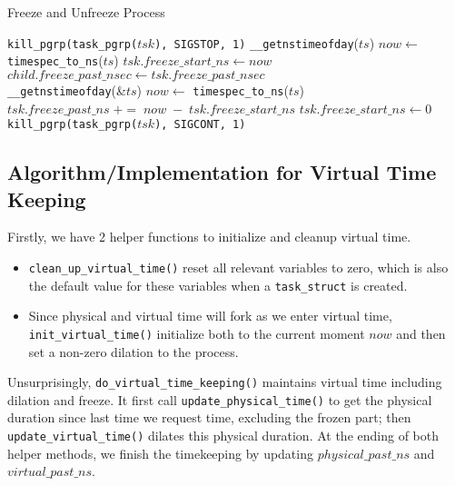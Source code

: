 \documentclass{acm_proc_article-sp}
\begin{document}
\label{Sub-Sec-Alg-Impl-Freeze}
\begin{algorithm*}[t]
\caption{Freeze and Unfreeze Process}
\label{Alg-Freeze}
\begin{algorithmic}[1]
\State \texttt{kill\_pgrp(task\_pgrp($tsk$), SIGSTOP, 1)}
\State \texttt{\_\_getnstimeofday}($ts$)
\State $now \gets$ \texttt{timespec\_to\_ns}($ts$)
\State $tsk.freeze\_start\_ns \gets now$
\EndFunction
\\
	\State $child.freeze\_past\_nsec \gets tsk.freeze\_past\_nsec$
	\State {}
\EndFor
\EndFunction
\\
\State \texttt{\_\_getnstimeofday}(\&$ts$)
\State $now \gets$ \texttt{timespec\_to\_ns}($ts$)
\State $tsk.freeze\_past\_ns \; += \; now \; - \; tsk.freeze\_start\_ns$
\State $tsk.freeze\_start\_ns \gets 0$
\State {}
\State \texttt{kill\_pgrp(task\_pgrp($tsk$), SIGCONT, 1)}
\EndFunction
\end{algorithmic}
\end{algorithm*}

\subsection{Algorithm/Implementation for Virtual Time Keeping}
Firstly, we have 2 helper functions to initialize and cleanup virtual time. 
\begin{itemize}
\item \texttt{clean\_up\_virtual\_time()} reset all relevant variables to zero, which is also the default value for these variables when a \texttt{task\_struct} is created.
\item Since physical and virtual time will fork as we enter virtual time, \texttt{init\_virtual\_time()} initialize both to the current moment $now$ and then set a non-zero dilation to the process. 
\end{itemize}

Unsurprisingly, \texttt{do\_virtual\_time\_keeping()} maintains virtual time including dilation and freeze. 
It first call \texttt{update\_physical\_time()} to get the physical duration since last time we request time, excluding the frozen part; then 
\texttt{update\_virtual\_time()} dilates this physical duration.
At the ending of both helper methods, we finish the timekeeping by updating $physical\_past\_ns$ and $virtual\_past\_ns$.
\end{document}
